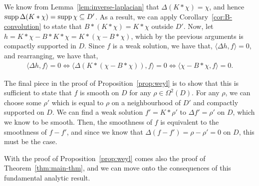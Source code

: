 We know from Lemma~\ref{lem:inverse-laplacian} that $ \Delta ( K * \chi )=\chi
$, and hence $ \operatorname{supp} \Delta ( K * \chi ) = \operatorname{supp} \chi \subseteq D' $. As a
result, we can apply Corollary~\ref{cor:B-convolution} to state that $ B* ( K*
	\chi ) = K*\chi $ outside $ D' $. Now, let $ h = K* \chi - B*K*\chi = K*( \chi
	- B*\chi) $, which by the previous arguments is compactly supported in $ D $.
Since $ f $ is a weak solution, we have that, $ \langle \Delta h, f \rangle =
	0 $, and rearranging, we have that,
\begin{align*}
	\langle \Delta h,f \rangle=0 \iff \langle \Delta ( K* ( \chi - B*\chi ) ), f \rangle=0
	\iff \langle \chi - B*\chi, f \rangle=0.
\end{align*}

The final piece in the proof of Proposition~\ref{prop:weyl} is to show that
this is sufficient to state that $ f $ is smooth on $ D $ for any $ \rho \in
	\Omega^{2}( D ) $. For any $ \rho $, we can choose some $ \rho' $ which is
equal to $ \rho $ on a neighbourhood of $ D' $ and compactly supported on $ D
$. We can find a weak solution $ f' = K* \rho' $ to $ \Delta f' = \rho' $ on $
	D $, which we know to be smooth. Then, the smoothness of $ f $ is equivalent to
the smoothness of $ f-f' $, and since we know that $ \Delta ( f - f' ) = \rho -
	\rho' = 0 $ on $ D $, this must be the case.

With the proof of Proposition~\ref{prop:weyl} comes also the proof of
Theorem~\ref{thm:main-thm}, and we can move onto the consequences of this
fundamental analytic result.
